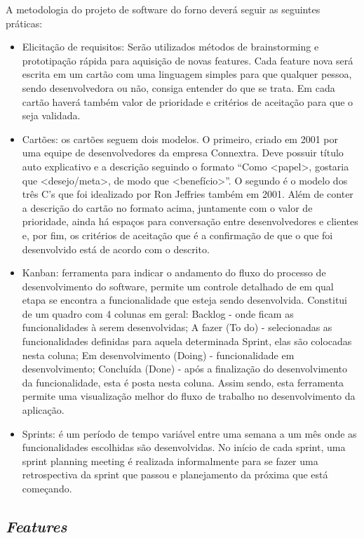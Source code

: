 A metodologia do projeto de software do forno deverá seguir as seguintes práticas:
\begin{itemize}
	\item Elicitação de requisitos: Serão utilizados métodos de brainstorming e prototipação rápida para aquisição de novas features. Cada feature nova será escrita em um cartão com uma linguagem simples para que qualquer pessoa, sendo desenvolvedora ou não, consiga entender do que se trata. Em cada cartão haverá também valor de prioridade e critérios de aceitação para que o seja validada.
	\item Cartões: os cartões seguem dois modelos. O primeiro, criado em 2001 por uma equipe de desenvolvedores da empresa Connextra. Deve possuir título auto explicativo e a descrição seguindo o formato “Como <papel>, gostaria que <desejo/meta>, de modo que <benefício>”. O segundo é o modelo dos três C’s que foi idealizado por Ron Jeffries também em 2001. Além de conter a descrição do cartão no formato acima, juntamente com o valor de prioridade, ainda há espaços para conversação entre desenvolvedores e clientes e, por fim, os critérios de aceitação que é a confirmação de que o que foi desenvolvido está de acordo com o descrito.
	\item Kanban: ferramenta para indicar o andamento do fluxo do processo de desenvolvimento do software, permite um controle detalhado de em qual etapa se encontra a funcionalidade que esteja sendo desenvolvida. Constitui de um quadro com 4 colunas em geral: Backlog - onde ficam as funcionalidades à serem desenvolvidas; A fazer (To do) - selecionadas as funcionalidades definidas para aquela determinada Sprint, elas são colocadas nesta coluna; Em desenvolvimento (Doing) - funcionalidade em desenvolvimento; Concluída (Done) - após a finalização do desenvolvimento da funcionalidade, esta é posta nesta coluna. Assim sendo, esta ferramenta permite uma visualização melhor do fluxo de trabalho no desenvolvimento da aplicação.
	\item Sprints: é um período de tempo variável entre uma semana a um mês onde as funcionalidades escolhidas são desenvolvidas. No início de cada sprint, uma sprint planning meeting é realizada informalmente para se fazer uma retrospectiva da sprint que passou e planejamento da próxima que está começando.

\end{itemize}

\subsection{\textit{Features}}

